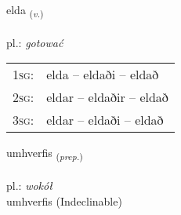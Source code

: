 \documentclass[frontgrid, backgrid]{flacards}\usepackage[]{graphicx}\usepackage[]{xcolor}
\begin{document}
\renewcommand{\flhead}{\vskip5pt \fboxsep=0pt {\small\bfseries\footnotesize Sagnorð | Verb}}
\renewcommand{\fcfoot}{\vskip5pt \fboxsep=0pt \hspace{2pt}{\small\bfseries\footnotesize 2K}}

\renewcommand{\blhead}{\vskip5pt {\small\bfseries\footnotesize Sagnorð | Verb }}
\renewcommand{\bcfoot}{\vskip5pt \hspace{2pt}{\small\bfseries\footnotesize 2K}}


{elda \small{\textsubscript{(\textit{v.})}} \\[1ex] %
\textphonetic{[ɛlta]} \\
pl.: \emph{gotować} \\  [2ex]
\renewcommand*{\arraystretch}{0.8}
\begin{tabular}{p{1cm}l}
\textsc{1sg}: & elda -- eldaði -- eldað \\ 
\textsc{2sg}: & eldar -- eldaðir -- eldað \\ 
\textsc{3sg}: & eldar -- eldaði -- eldað \\ 
\end{tabular}
}


\renewcommand{\flhead}{\vskip5pt \fboxsep=0pt {\small\bfseries\footnotesize Forsetning | Preposition}}
\renewcommand{\fcfoot}{\vskip5pt \fboxsep=0pt \hspace{2pt}{\small\bfseries\footnotesize 2K}}

\renewcommand{\blhead}{\vskip5pt {\small\bfseries\footnotesize Forsetning | Preposition }}
\renewcommand{\bcfoot}{\vskip5pt \hspace{2pt}{\small\bfseries\footnotesize 2K}}


{umhverfis \small{\textsubscript{(\textit{prep.})}} \\[1ex]
\textphonetic{[ʏmkʰvɛrvɪs]} \\
pl.: \emph{wokół} \\  [2ex]
umhverfis (Indeclinable)}
\end{document}
